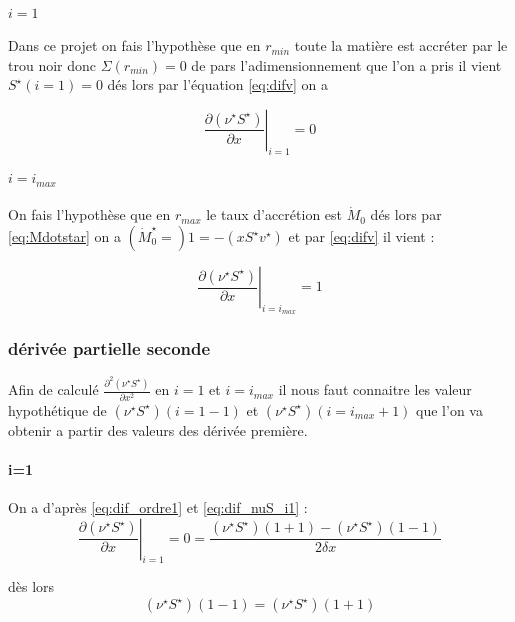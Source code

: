 \paragraph{$i=1$}
Dans ce projet on fais l'hypothèse que en $r_{min}$ toute la matière est accréter par le trou noir donc $\Sigma(r_{min})=0$ de pars l'adimensionnement que l'on a pris il vient $S^{\star}(i=1)=0$ dés lors par l'équation \eqref{eq:difv} on a

\begin{equation}
\left. \frac{\partial (\nu^{\star} S^{\star})}{\partial x}\right|_{i=1}=0\label{eq:dif_nuS_i1}
\end{equation}

\paragraph{$i=i_{max}$}
On fais l'hypothèse que en $r_{max}$ le taux d'accrétion est $\dot{M}_0$ dés lors par \eqref{eq:Mdotstar} on a $(\dot{M}^{\star}_0=)1 = -(x S^{\star}v^{\star})$ et par \eqref{eq:difv} il vient :

\begin{equation}
\left. \frac{\partial (\nu^{\star} S^{\star})}{\partial x}\right|_{i=i_{max}}=1\label{eq:dif_nuS_imax}
\end{equation}

\subsubsection{dérivée partielle seconde}
Afin de calculé $\frac{\partial^2(\nu^{\star} S^{\star})} {\partial x^2}$ en $i=1$ et $i=i_{max}$ il nous faut connaitre les valeur hypothétique de $(\nu^{\star} S^{\star})(i=1-1)$ et $(\nu^{\star} S^{\star})(i=i_{max}+1)$ que l'on va obtenir a partir des valeurs des dérivée première.

\paragraph{i=1}
On a d'après \eqref{eq:dif_ordre1} et \eqref{eq:dif_nuS_i1} :
\begin{equation}
\left. \frac{\partial (\nu^{\star} S^{\star})}{\partial x}\right|_{i=1}=0=\frac{ (\nu^{\star} S^{\star})(1+1) - (\nu^{\star} S^{\star})(1-1)}{2\delta x}
\end{equation}

dès lors
\begin{equation}
(\nu^{\star} S^{\star})(1-1)=(\nu^{\star} S^{\star})(1+1)
\end{equation}

